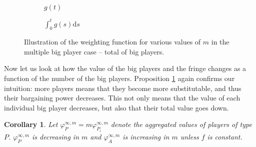 \documentclass[a4paper]{article}
\newtheorem{corollary}{Corollary}
\newcommand{\ds}{\mathrm{d}s}
\begin{document}
\begin{figure}[ht]
    \centering
    \begin{subfigure}[b]{0.45\textwidth}
        \centering
        \caption{$g(t)$}
    \end{subfigure}
    \begin{subfigure}[b]{0.45\textwidth}
        \centering
        \caption{$\int_0^t g(s) \ds$}
    \end{subfigure}
    \caption{Illustration of the weighting function for various values of $m$ in the multiple big player case -- total of big players.}
    \label{fig:multiple_platforms_total}
\end{figure}

Now let us look at how the value of the big players and the fringe changes as a function of the number of the big players.
Proposition \cref{cor:multiple_platforms_2} again confirms our intuition: more players means that they become more substitutable, and thus their bargaining power decreases.
This not only means that the value of each individual big player decreases, but also that their total value goes down.

\begin{corollary}
    \label{cor:multiple_platforms_2}
    Let $\varphi_{P}^{\infty, m} = m\varphi_{P_i}^{\infty, m}$ denote the aggregated values of players of type $P$. $\varphi_{P}^{\infty, m}$ is decreasing in $m$ and $\varphi_{A}^{\infty, m}$ is increasing in $m$ unless $f$ is constant.
\end{corollary}
\end{document}
